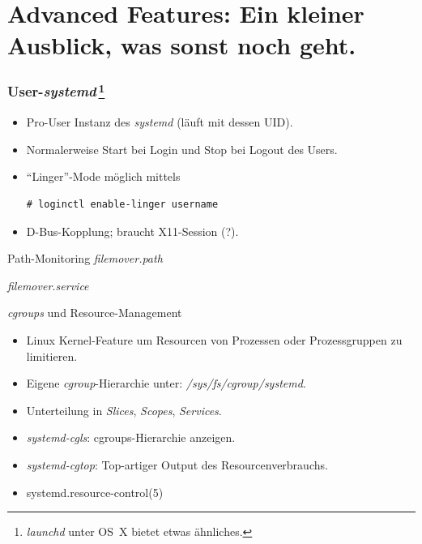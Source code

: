 \section[Advanced]{Advanced Features: Ein kleiner Ausblick, was sonst
noch geht.}

\begin{frame}[fragile]
\frametitle{User-\emph{systemd}\,\footnote{\emph{launchd} unter OS~X
bietet etwas ähnliches.}}
\begin{itemize}
\item Pro-User Instanz des \emph{systemd} (läuft mit dessen UID).
\item Normalerweise Start bei Login und Stop bei Logout des Users.
\item ``Linger''-Mode möglich mittels
\begin{lstlisting}
# loginctl enable-linger username
\end{lstlisting}
\item D-Bus-Kopplung; braucht X11-Session (?).
\end{itemize}
\vspace*{1ex}
\end{frame}


\begin{frame}{Path-Monitoring}
\emph{filemover.path}
\footnotesize


{\normalsize\emph{filemover.service}}

\end{frame}


\begin{frame}{\emph{cgroups} und Resource-Management}
\begin{itemize}
\item Linux Kernel-Feature um Resourcen von Prozessen oder
Prozessgruppen zu limitieren.
\item Eigene \emph{cgroup}-Hierarchie unter: \emph{/sys/fs/cgroup/systemd}.
\item Unterteilung in \emph{Slices}, \emph{Scopes}, \emph{Services}.
\item \emph{systemd-cgls}: cgroups-Hierarchie anzeigen.
\item \emph{systemd-cgtop}: Top-artiger Output des Resourcenverbrauchs.
\item systemd.resource-control(5)
\end{itemize}
\end{frame}


